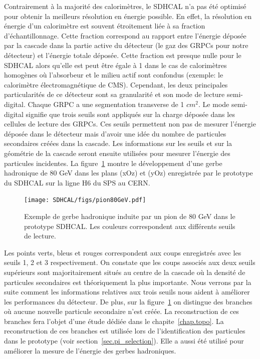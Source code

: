 Contrairement à la majorité des calorimètres, le SDHCAL n'a pas été optimisé pour obtenir la meilleurs résolution en énergie possible. En effet, la résolution en énergie d'un calorimètre est souvent étroitement liée à sa fraction d’échantillonnage. Cette fraction correspond au rapport entre l'énergie déposée par la cascade dans la partie active du détecteur (le gaz des GRPCs pour notre détecteur) et l'énergie totale déposée. Cette fraction est presque nulle pour le SDHCAL alors qu'elle est peut être égale à 1 dans le cas de calorimètres homogènes où l'absorbeur et le milieu actif sont confondus (exemple: le calorimètre électromagnétique de CMS). Cependant, les deux principales particularités de ce détecteur sont sa granularité et son mode de lecture semi-digital. Chaque GRPC a une segmentation transverse de 1 $cm^2$. Le mode semi-digital signifie que trois seuils sont appliqués sur la charge déposée dans les cellules de lecture des GRPCs. Ces seuils permettent non pas de mesurer l’énergie déposée dans le détecteur mais d'avoir une idée du nombre de particules secondaires créées dans la cascade. Les informations sur les seuils et sur la géométrie de la cascade seront ensuite utilisées pour mesurer l'énergie des particules incidentes. La figure~\ref{fig:shower80} montre le développement d'une gerbe hadronique de 80 GeV dans les plans (xOz) et (yOz) enregistrée par le prototype du SDHCAL sur la ligne H6 du SPS au CERN.
\begin{figure}[!h]
  \begin{center}
    \texttt{[image: SDHCAL/figs/pion80GeV.pdf]}
    \caption{Exemple de gerbe hadronique induite par un pion de 80 GeV dans le prototype SDHCAL. Les couleurs correspondent aux différents seuils de lecture.}
    \label{fig:shower80}
  \end{center}
\end{figure}
Les points verts, bleus et rouges correspondent aux coups enregistrés avec les seuils 1, 2 et 3 respectivement. On constate que les coups associés aux deux seuils supérieurs sont majoritairement situés au centre de la cascade où la densité de particules secondaires est théoriquement la plus importante. Nous verrons par la suite comment les informations relatives aux trois seuils nous aident à améliorer les performances du détecteur. De plus, sur la figure~\ref{fig:shower80} on distingue des branches où aucune nouvelle particule secondaire n'est créée. La reconstruction de ces branches fera l'objet d'une étude dédiée dans le chapite~\ref{chap.topo}. La reconstruction de ces branches est utilisée lors de l'identification des particules dans le prototype (voir section~\ref{sec.pi_selection}). Elle a aussi été utilisé pour améliorer la mesure de l'énergie des gerbes hadroniques.

